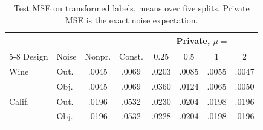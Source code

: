 \begin{table}[t]
\centering
\caption{Test MSE on transformed labels, means over five splits. Private MSE is the exact noise expectation.}
\label{tab:utility}
\footnotesize
\setlength{\tabcolsep}{2.5pt}
\begin{tabular}{llcccccc}
\toprule
 & & & & \multicolumn{4}{c}{Private, $\mu=$} \\
\cmidrule(lr){5-8}
Design & Noise & Nonpr. & Const. & 0.25 & 0.5 & 1 & 2 \\
\midrule
Wine & Out. & .0045 & .0069 & .0203 & .0085 & .0055 & .0047 \\
 & Obj. & .0045 & .0069 & .0360 & .0124 & .0065 & .0050 \\
Calif. & Out. & .0196 & .0532 & .0230 & .0204 & .0198 & .0196 \\
 & Obj. & .0196 & .0532 & .0228 & .0204 & .0198 & .0196 \\
\bottomrule
\end{tabular}
\end{table}
